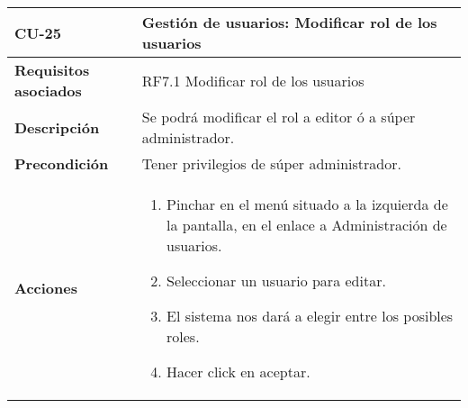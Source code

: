 \newpage
\begin{longtable}[t]{@{}ll@{}}
\toprule
\begin{minipage}[t]{0.23\columnwidth}\raggedright\strut
\textbf{CU-25}\strut
\end{minipage} & \begin{minipage}[b]{0.71\columnwidth}\raggedright\strut
\textbf{Gestión de usuarios: Modificar rol de los usuarios}\strut
\end{minipage}\tabularnewline
\midrule
\endhead
\begin{minipage}[t]{0.23\columnwidth}\raggedright\strut
\textbf{Requisitos asociados}\strut
\end{minipage} & \begin{minipage}[t]{0.71\columnwidth}\raggedright\strut
RF7.1 Modificar rol de los usuarios \strut
\end{minipage}\tabularnewline
\begin{minipage}[t]{0.23\columnwidth}\raggedright\strut
\textbf{Descripción}\strut
\end{minipage} & \begin{minipage}[t]{0.71\columnwidth}\raggedright\strut
Se podrá modificar el rol a editor ó a súper administrador.
\strut
\end{minipage}\tabularnewline
\begin{minipage}[t]{0.23\columnwidth}\raggedright\strut
\textbf{Precondición}\strut
\end{minipage} & \begin{minipage}[t]{0.71\columnwidth}\raggedright\strut
Tener privilegios de súper administrador.\strut
\end{minipage}\tabularnewline
\begin{minipage}[t]{0.23\columnwidth}\raggedright\strut
\textbf{Acciones}\strut
\end{minipage} & \begin{minipage}[t]{0.71\columnwidth}\raggedright\strut
\begin{enumerate}
\def\labelenumi{\arabic{enumi}.}
\tightlist
\item
Pinchar en el menú situado a la izquierda de la pantalla, en el
enlace a Administración de usuarios.
\item
Seleccionar un usuario para editar.
\item
El sistema nos dará a elegir entre los posibles roles.
\item
Hacer click en aceptar.
\end{enumerate}\strut
\end{minipage}\tabularnewline

\end{longtable}
